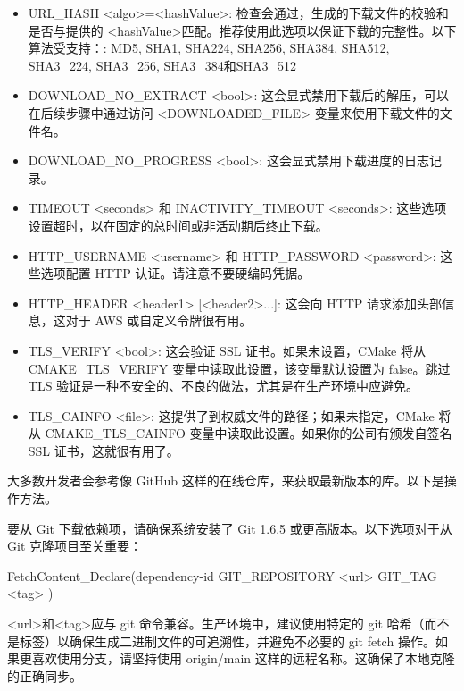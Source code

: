 \begin{itemize}
\item
URL\_HASH <algo>=<hashValue>: 检查会通过，生成的下载文件的校验和是否与提供的 <hashValue>匹配。推荐使用此选项以保证下载的完整性。以下算法受支持：: MD5, SHA1, SHA224, SHA256, SHA384, SHA512, SHA3\_224, SHA3\_256, SHA3\_384和SHA3\_512

\item
DOWNLOAD\_NO\_EXTRACT <bool>: 这会显式禁用下载后的解压，可以在后续步骤中通过访问 <DOWNLOADED\_FILE> 变量来使用下载文件的文件名。

\item
DOWNLOAD\_NO\_PROGRESS <bool>: 这会显式禁用下载进度的日志记录。

\item
TIMEOUT <seconds> 和 INACTIVITY\_TIMEOUT <seconds>: 这些选项设置超时，以在固定的总时间或非活动期后终止下载。

\item
HTTP\_USERNAME <username> 和 HTTP\_PASSWORD <password>: 这些选项配置 HTTP 认证。请注意不要硬编码凭据。

\item
HTTP\_HEADER <header1> [<header2>...]: 这会向 HTTP 请求添加头部信息，这对于 AWS 或自定义令牌很有用。

\item
TLS\_VERIFY <bool>: 这会验证 SSL 证书。如果未设置，CMake 将从 CMAKE\_TLS\_VERIFY 变量中读取此设置，该变量默认设置为 false。跳过 TLS 验证是一种不安全的、不良的做法，尤其是在生产环境中应避免。

\item
TLS\_CAINFO <file>: 这提供了到权威文件的路径；如果未指定，CMake 将从 CMAKE\_TLS\_CAINFO 变量中读取此设置。如果你的公司有颁发自签名 SSL 证书，这就很有用了。
\end{itemize}

大多数开发者会参考像 GitHub 这样的在线仓库，来获取最新版本的库。以下是操作方法。


要从 Git 下载依赖项，请确保系统安装了 Git 1.6.5 或更高版本。以下选项对于从 Git 克隆项目至关重要：

\begin{shell}
FetchContent_Declare(dependency-id
                     GIT_REPOSITORY <url>
                     GIT_TAG <tag>
)
\end{shell}

<url>和<tag>应与 git 命令兼容。生产环境中，建议使用特定的 git 哈希（而不是标签）以确保生成二进制文件的可追溯性，并避免不必要的 git fetch 操作。如果更喜欢使用分支，请坚持使用 origin/main 这样的远程名称。这确保了本地克隆的正确同步。

